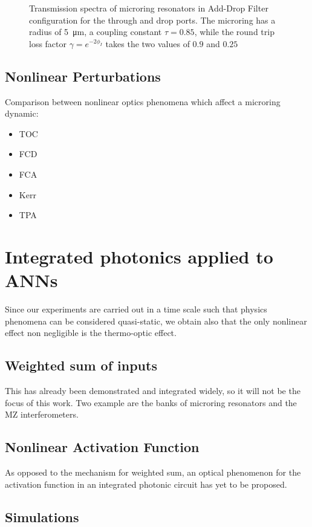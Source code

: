 \begin{figure}[ht]
	\centering
	
	\caption{Transmission spectra of microring resonators in Add-Drop Filter configuration for the through and drop ports.
	The microring has a radius of \SI{5}{\um}, a coupling constant $\tau=0.85$, while the round trip loss factor $\gamma=e^{-2\phi_I}$ takes the two values of $0.9$ and $0.25$}
	\label{fig:ADF}
\end{figure}

\subsection{Nonlinear Perturbations}
\label{ssec:Nonlinear_Perturbations}

Comparison between nonlinear optics phenomena which affect a microring dynamic:
\begin{itemize}
\item TOC
\item FCD
\item FCA
\item Kerr
\item TPA
\end{itemize}

\section{Integrated photonics applied to ANNs}
\label{sec:Integrated_photonics_applied_to_ANNs}
Since our experiments are carried out in a time scale such that physics phenomena can be considered quasi-static, we obtain also that the only nonlinear effect non negligible is the thermo-optic effect.

\subsection{Weighted sum of inputs}
\label{ssec:Weighted_Sum_of_inputs}
This has already been demonstrated and integrated widely, so it will not be the focus of this work.
Two example are the banks of microring resonators and the MZ interferometers.

\subsection{Nonlinear Activation Function}
\label{ssec:Nonlinear_Activation_Function}
As opposed to the mechanism for weighted sum, an optical phenomenon for the activation function in an integrated photonic circuit has yet to be proposed.

\subsection{Simulations}
\label{ssec:Simulations}

\begin{figure}[ht]
	\centering
	
	\caption{}
\end{figure}

\begin{figure}[ht]
	\centering
	
	\caption{}
\end{figure}